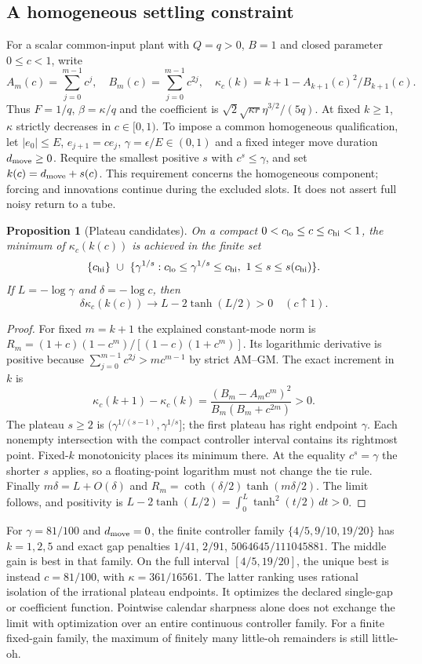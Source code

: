\documentclass[11pt]{article}
\newtheorem{proposition}{Proposition}
\begin{document}
\subsection{A homogeneous settling constraint}
For a scalar common-input plant with $Q=q>0$, $B=1$ and closed parameter
$0\le c<1$, write
\[
A_m(c)=\sum_{j=0}^{m-1}c^j,\quad B_m(c)=\sum_{j=0}^{m-1}c^{2j},
\quad \kappa_c(k)=k+1-A_{k+1}(c)^2/B_{k+1}(c).
\]
Thus $F=1/q$, $\beta=\kappa/q$ and the coefficient is
$\sqrt{2}\sqrt{\kappa r}\eta^{3/2}/(5q)$.
At fixed $k\ge1$, $\kappa$ strictly decreases in $c\in[0,1)$.
To impose a common homogeneous qualification, let $|e_0|\le E$,
$e_{j+1}=ce_j$, $\gamma=\epsilon/E\in(0,1)$ and a fixed integer
move duration $d_{\rm move}\ge0$. Require the smallest positive $s$ with
$c^s\le\gamma$, and set $k(c)=d_{\rm move}+s(c)$.
This requirement concerns the homogeneous component; forcing and innovations
continue during the excluded slots. It does not assert full noisy return to a tube.

\begin{proposition}[Plateau candidates]\label{prop:settling}
On a compact $0<c_{\rm lo}\le c\le c_{\rm hi}<1$, the minimum of
$\kappa_c(k(c))$ is achieved in the finite set
\[
\{c_{\rm hi}\}\ \cup\
\{\gamma^{1/s}:c_{\rm lo}\le\gamma^{1/s}\le c_{\rm hi},
\ 1\le s\le s(c_{\rm hi})\}.
\]
If $L=-\log\gamma$ and $\delta=-\log c$, then
\[
\delta\kappa_c(k(c))\longrightarrow L-2\tanh(L/2)>0
\quad(c\uparrow1).
\]
\end{proposition}
\begin{proof}
For fixed $m=k+1$ the explained constant-mode norm is
$R_m=(1+c)(1-c^m)/[(1-c)(1+c^m)]$.
Its logarithmic derivative is positive because
$\sum_{j=0}^{m-1}c^{2j}>mc^{m-1}$ by strict AM--GM.
The exact increment in $k$ is
\[
\kappa_c(k+1)-\kappa_c(k)
=\frac{(B_m-A_mc^m)^2}{B_m(B_m+c^{2m})}>0.
\]
The plateau $s\ge2$ is $(\gamma^{1/(s-1)},\gamma^{1/s}]$;
the first plateau has right endpoint $\gamma$.
Each nonempty intersection with the compact controller interval contains its
rightmost point. Fixed-$k$ monotonicity places its minimum there.
At the equality $c^s=\gamma$ the shorter $s$ applies, so a floating-point
logarithm must not change the tie rule.
Finally $m\delta=L+O(\delta)$ and
$R_m=\coth(\delta/2)\tanh(m\delta/2)$.
The limit follows, and positivity is
$L-2\tanh(L/2)=\int_0^L\tanh^2(t/2)\,dt>0$.
\end{proof}
For $\gamma=81/100$ and $d_{\rm move}=0$, the finite controller family
$\{4/5,9/10,19/20\}$ has $k=1,2,5$ and exact gap penalties
$1/41$, $2/91$, $5064645/111045881$.
The middle gain is best in that family. On the full interval $[4/5,19/20]$,
the unique best is instead $c=81/100$, with $\kappa=361/16561$.
The latter ranking uses rational isolation of the irrational plateau endpoints.
It optimizes the declared single-gap or coefficient function. Pointwise
calendar sharpness alone does not exchange the limit with optimization over
an entire continuous controller family. For a finite fixed-gain family,
the maximum of finitely many little-oh remainders is still little-oh.
\end{document}

